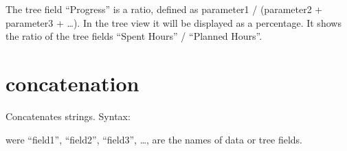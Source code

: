 \documentclass[letterpaper,10pt,english]{sphinxmanual}
\begin{document}
\begin{sphinxVerbatim}[commandchars=\\\{\}]
 
     
     \PYG{p}{[} \PYG{p}{]}
     \PYG{p}{[}\PYG{p}{]}
     \PYG{p}{[}\PYG{p}{]}
     \PYG{p}{[}\PYG{p}{]}
\end{sphinxVerbatim}

\sphinxAtStartPar
The tree field “Progress” is a ratio, defined as parameter1 / (parameter2 + parameter3 + …). In the tree view it will be displayed as a percentage. It shows the ratio of the tree fields “Spent Hours” / “Planned Hours”.


\section{concatenation}
\label{\detokenize{tree-fields:concatenation}}
\sphinxAtStartPar
Concatenates strings.
Syntax:

\begin{sphinxVerbatim}[commandchars=\\\{\}]
 
     
     \PYG{p}{[}  \PYG{p}{]}
     \PYG{p}{[} \PYG{p}{]}
     \PYG{p}{[}\PYG{p}{]}
     \PYG{p}{[}\PYG{p}{]}
\end{sphinxVerbatim}

\sphinxAtStartPar
were “field1”, “field2”, “field3”, …, are the names of data or tree fields.
\end{document}
